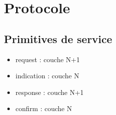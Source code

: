 \documentclass[resume]{subfiles}
\begin{document}
\section{Protocole}

\subsection{Primitives de service}
\begin{itemize}
\item request : couche N+1
\item indication : couche N
\item response : couche N+1
\item confirm : couche N
\end{itemize}
\end{document}
